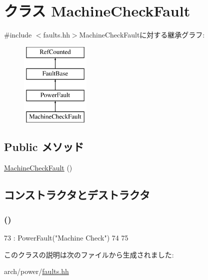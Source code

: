\hypertarget{classPowerISA_1_1MachineCheckFault}{
\section{クラス MachineCheckFault}
\label{classPowerISA_1_1MachineCheckFault}
}


{\ttfamily \#include $<$faults.hh$>$}MachineCheckFaultに対する継承グラフ:\begin{figure}[H]
\begin{center}
\leavevmode
\includegraphics[height=4cm]{classPowerISA_1_1MachineCheckFault}
\end{center}
\end{figure}
\subsection*{Public メソッド}
\begin{DoxyCompactItemize}
\item 
\hyperlink{classPowerISA_1_1MachineCheckFault_a418918b059142061e9c5e617a9e6bbe3}{MachineCheckFault} ()
\end{DoxyCompactItemize}


\subsection{コンストラクタとデストラクタ}
\hypertarget{classPowerISA_1_1MachineCheckFault_a418918b059142061e9c5e617a9e6bbe3}{
\subsubsection[{MachineCheckFault}]{ ()}}
\label{classPowerISA_1_1MachineCheckFault_a418918b059142061e9c5e617a9e6bbe3}



\begin{DoxyCode}
73         : PowerFault("Machine Check")
74     {
75     }
\end{DoxyCode}


このクラスの説明は次のファイルから生成されました:\begin{DoxyCompactItemize}
\item 
arch/power/\hyperlink{arch_2power_2faults_8hh}{faults.hh}\end{DoxyCompactItemize}
